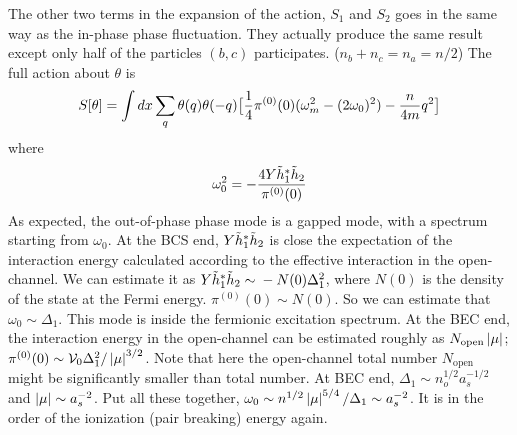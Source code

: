 The other two terms in the expansion of the action, $S_{1}$ and $S_{2}$ goes in the same way as the in-phase phase fluctuation.  They actually produce the same result except only half of the particles $(b,c)$ participates. ($n_{b}+n_{c}=n_{a}=n/2$)   The full action about $\theta$ is 
\begin{equation}
S[\theta]=\int{dx}\sum_{q}\theta(q)\theta(-q)\big[\frac{1}{4}\pi^{(0)}(0)(\omega_m^2-(2\omega_{0})^{2})-\frac{n}{4m}q^2\big]
\end{equation}
where
\begin{equation}
\omega_{0}^{2}=-\frac{4Y\tilde{h}_{1}^{*}\tilde{h}_{2}}{\pi^{(0)}(0)}
\end{equation}
As expected, the out-of-phase phase mode is a gapped mode, with a spectrum starting from $\omega_{0}$.  At the BCS end, $Y\tilde{h}_{1}^{*}\tilde{h}_{2}$ is close the expectation of the interaction energy calculated according to the effective interaction in the open-channel.  We can estimate it as $Y\tilde{h}_{1}^{*}\tilde{h}_{2}\sim{}-N(0)\Delta_{1}^{2}$, where $N(0)$ is the density of the state at the Fermi energy.  $\pi^{(0)}(0)\sim{}N(0)$.  So we can estimate that $\omega_{0}\sim\Delta_{1}$.  This mode is inside the fermionic excitation spectrum.  At the BEC end, the interaction energy in the open-channel can be estimated roughly as $N_{\text{open}}\left\lvert{\mu}\right\rvert$; $\pi^{(0)}(0)\sim{}\mathcal{V}_{0}\Delta_{1}^{2}/\left\lvert{\mu}\right\rvert^{3/2}$. Note that here the open-channel total number $N_{\text{open}}$ might be significantly smaller than total number. At BEC end, $\Delta_{1}\sim{}n_{o}^{1/2}a_{s}^{-1/2}$ and $\left\lvert{\mu}\right\rvert\sim{}a_{s}^{-2}$.  Put all these together, $\omega_{0}\sim{}n^{1/2}\left\lvert{\mu}\right\rvert^{5/4}/\Delta_{1}\sim{}a_{s}^{-2}$. It is in the order of the ionization (pair breaking) energy again. 
%






